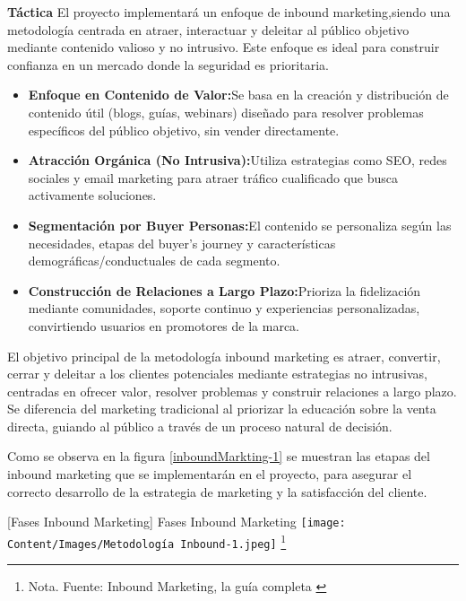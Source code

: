 \textbf{Táctica}
El proyecto implementará un enfoque de inbound marketing,siendo una metodología centrada en atraer, interactuar y deleitar al público objetivo mediante contenido valioso y no intrusivo. Este enfoque es ideal para construir confianza en un mercado donde la seguridad es prioritaria.

\begin{itemize}
    \item \textbf{Enfoque en Contenido de Valor:}Se basa en la creación y distribución de contenido útil (blogs, guías, webinars) diseñado para resolver problemas específicos del público objetivo, sin vender directamente.
    \item \textbf{Atracción Orgánica (No Intrusiva):}Utiliza estrategias como SEO, redes sociales y email marketing para atraer tráfico cualificado que busca activamente soluciones.
    \item \textbf{Segmentación por Buyer Personas:}El contenido se personaliza según las necesidades, etapas del buyer's journey y características demográficas/conductuales de cada segmento.
    \item \textbf{Construcción de Relaciones a Largo Plazo:}Prioriza la fidelización mediante comunidades, soporte continuo y experiencias personalizadas, convirtiendo usuarios en promotores de la marca.
\end{itemize}
El objetivo principal de la metodología inbound marketing es atraer, convertir, cerrar y deleitar a los clientes potenciales mediante estrategias no intrusivas, centradas en ofrecer valor, resolver problemas y construir relaciones a largo plazo. Se diferencia del marketing tradicional al priorizar la educación sobre la venta directa, guiando al público a través de un proceso natural de decisión.

Como se observa en la figura \ref{inboundMarkting-1} se muestran las etapas del inbound marketing que se implementarán en el proyecto, para asegurar el correcto desarrollo de la estrategia de marketing y la satisfacción del cliente.



\vspace{2mm}
        \begin{minipage}{0.9\textwidth}
        \centering
        [{Fases Inbound Marketing}]{ Fases Inbound Marketing  }
        \label{inboundMarkting-1}
         \texttt{[image: Content/Images/Metodología Inbound-1.jpeg]}
        \footnote{Nota. \textup{Fuente: Inbound Marketing, la guía completa \cite{InboundMarketing}}}
\end{minipage}

